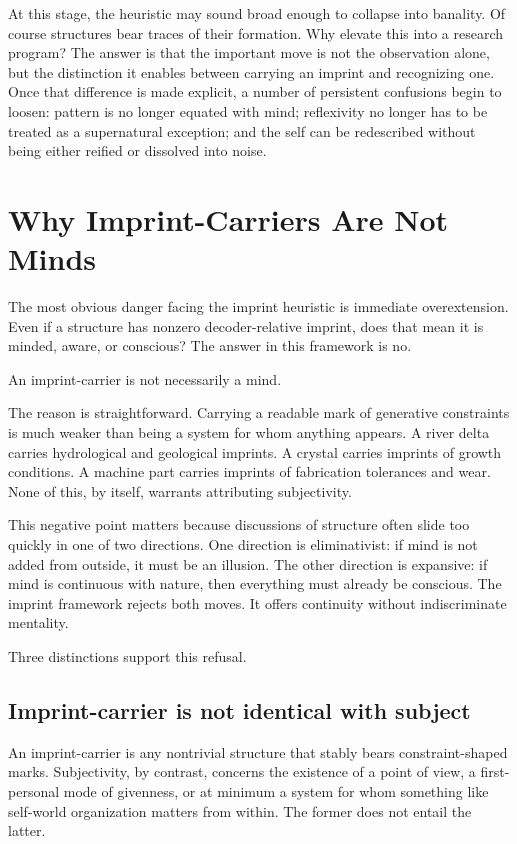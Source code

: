 \documentclass[12pt,a4paper]{article}
\begin{document}
At this stage, the heuristic may sound broad enough to collapse into banality. Of course structures bear traces of their formation. Why elevate this into a research program? The answer is that the important move is not the observation alone, but the distinction it enables between carrying an imprint and recognizing one. Once that difference is made explicit, a number of persistent confusions begin to loosen: pattern is no longer equated with mind; reflexivity no longer has to be treated as a supernatural exception; and the self can be redescribed without being either reified or dissolved into noise.

\section{Why Imprint-Carriers Are Not Minds}

The most obvious danger facing the imprint heuristic is immediate
overextension. Even if a structure has nonzero decoder-relative imprint,
does that mean it is minded, aware, or conscious? The answer in this
framework is no.

An imprint-carrier is not necessarily a mind.

The reason is straightforward. Carrying a readable mark of generative constraints is much weaker than being a system for whom anything appears. A river delta carries hydrological and geological imprints. A crystal carries imprints of growth conditions. A machine part carries imprints of fabrication tolerances and wear. None of this, by itself, warrants attributing subjectivity.

This negative point matters because discussions of structure often slide too quickly in one of two directions. One direction is eliminativist: if mind is not added from outside, it must be an illusion. The other direction is expansive: if mind is continuous with nature, then everything must already be conscious. The imprint framework rejects both moves. It offers continuity without indiscriminate mentality.

Three distinctions support this refusal.

\subsection{Imprint-carrier is not identical with subject}

An imprint-carrier is any nontrivial structure that stably bears constraint-shaped marks. Subjectivity, by contrast, concerns the existence of a point of view, a first-personal mode of givenness, or at minimum a system for whom something like self-world organization matters from within. The former does not entail the latter.
\end{document}
